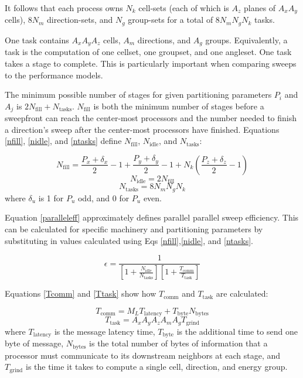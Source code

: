 \documentclass[11pt, letterpaper,titlepage,oneside]{article}
\begin{document}
It follows that each process owns $N_k$ cell-sets (each of which is $A_z$ planes of $A_x A_y$ cells), $8N_m$ direction-sets, and $N_g$ group-sets for a total of $8N_m N_g N_k$ tasks.

One task contains $A_x A_y A_z$ cells, $A_m$ directions, and $A_g$ groups. Equivalently, a task is the computation of one cellset, one groupset, and one angleset. One task takes a stage to complete.  This is particularly important when comparing sweeps to the performance models. 

The minimum possible number of stages for given partitioning parameters $P_i$ and $A_j$ is $2 N_{\text{fill}}+N_{\text{tasks}}$. $N_{\text{fill}}$ is both the minimum number of stages before a sweepfront can reach the center-most processors and the number needed to finish a direction's sweep after the center-most processors have finished. Equations \ref{nfill}, \ref{nidle}, and \ref{ntasks} define $N_{\text{fill}}$, $N_{\text{idle}}$, and $N_{\text{tasks}}$:

\begin{equation}
N_{\text{fill}} = \frac{P_x + \delta_x}{2} - 1 + \frac{P_y + \delta_y}{2} - 1 + N_k (\frac{P_z + \delta_z}{2} - 1)
\label{nfill}
\end{equation}
\begin{equation}
N_{\text{idle}} = 2 N_{\text{fill}}
\label{nidle}
\end{equation}
\begin{equation}
N_{\text{tasks}} = 8 N_m N_g N_k
\label{ntasks}
\end{equation}
where $\delta_u$ is 1 for $P_u$ odd, and 0 for $P_u$ even.

Equation \ref{paralleleff} approximately defines parallel parallel sweep efficiency. This can be calculated for specific machinery and partitioning parameters by substituting in values calculated using Eqs \ref{nfill},\ref{nidle}, and \ref{ntasks}.

\begin{equation}
\epsilon = \frac{1}{[1+\frac{N_{\text{idle}}}{N_{\text{tasks}}}][1 + \frac{T_{\text{comm}}}{T_{\text{task}}}]}
\label{paralleleff}
\end{equation}

Equations \ref{Tcomm} and \ref{Ttask} show how $T_{\text{comm}}$ and $T_{\text{task}}$ are calculated:

\begin{equation}
T_{\text{comm}} = M_L T_{\text{latency}} + T_{\text{byte}} N_{\text{bytes}}
\label{Tcomm}
\end{equation}
\begin{equation}
T_{\text{task}} = A_x A_y A_z A_m A_g T_{\text{grind}}
\label{Ttask}
\end{equation}
where $T_{\text{latency}}$ is the message latency time, $T_{\text{byte}}$ is the additional time to send one byte of message, $N_{\text{bytes}}$ is the total number of bytes of information that a processor must communicate to its downstream neighbors at each stage, and $T_{\text{grind}}$ is the time it takes to compute a single cell, direction, and energy group.
\end{document}
